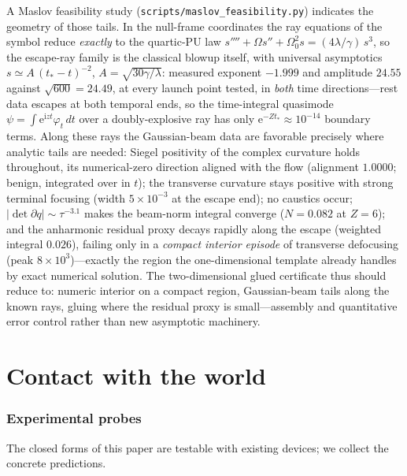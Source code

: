 \documentclass[11pt]{article}
\theoremstyle{definition}
\theoremstyle{remark}
\newcommand{\ii}{\mathrm{i}}
\newcommand{\ee}{\mathrm{e}}
\begin{document}
A Maslov feasibility study (\texttt{scripts/maslov\_feasibility.py}) indicates the
geometry of those tails. In the null-frame coordinates the ray equations
of the symbol reduce \emph{exactly} to the quartic-PU law
$s''''+\Omega s''+\Omega_0^{2}s=(4\lambda/\gamma)\,s^{3}$, so the
escape-ray family is the classical blowup itself, with universal
asymptotics $s\simeq A\,(t_*-t)^{-2}$, $A=\sqrt{30\gamma/\lambda}$:
measured exponent $-1.999$ and amplitude $24.55$ against
$\sqrt{600}=24.49$, at every launch point tested, in \emph{both} time
directions---rest data escapes at both temporal ends, so the
time-integral quasimode $\psi=\int\ee^{\ii z t}\varphi_t\,dt$ over a
doubly-explosive ray has only $\ee^{-Zt_*}\!\approx\!10^{-14}$ boundary
terms. Along these rays the Gaussian-beam data \cite{Ralston1982} are
favorable precisely where analytic tails are needed: Siegel positivity of the complex
curvature holds throughout, its numerical-zero direction aligned with
the flow (alignment $1.0000$; benign, integrated over in $t$); the
transverse curvature stays positive with strong terminal focusing
(width $5\times10^{-3}$ at the escape end); no caustics occur;
$|\det\partial q|\sim\tau^{-3.1}$ makes the beam-norm integral converge
($N=0.082$ at $Z=6$); and the anharmonic residual proxy decays rapidly
along the escape (weighted integral $0.026$), failing only in a
\emph{compact interior episode} of transverse defocusing (peak
$8\times10^{3}$)---exactly the region the one-dimensional template
already handles by exact numerical solution. The two-dimensional glued
certificate thus should reduce to: numeric interior on a compact region,
Gaussian-beam tails along the known rays, gluing where the residual
proxy is small---assembly and quantitative error control rather than
new asymptotic machinery.

\part{Contact with the world}

\section{Experimental probes}
\label{sec:probes}

The closed forms of this paper are testable with existing devices;
we collect the concrete predictions.
\end{document}
